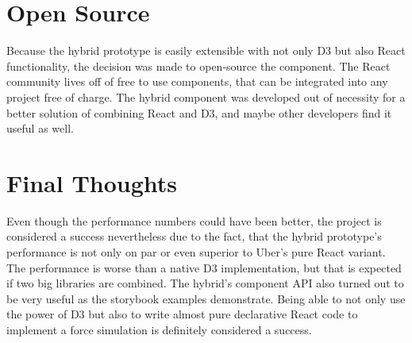 \section{Open Source}

Because the hybrid prototype is easily extensible with not only D3 but also React functionality, the decision was made to open-source the component. The React community lives off of free to use components, that can be integrated into any project free of charge. The hybrid component was developed out of necessity for a better solution of combining React and D3, and maybe other developers find it useful as well.

\section{Final Thoughts}

Even though the performance numbers could have been better, the project is considered a success nevertheless due to the fact, that the hybrid prototype's performance is not only on par or even superior to Uber's pure React variant. The performance is worse than a native D3 implementation, but that is expected if two big libraries are combined. The hybrid's component API also turned out to be very useful as the storybook examples demonstrate. Being able to not only use the power of D3 but also to write almost pure declarative React code to implement a force simulation is definitely considered a success.







